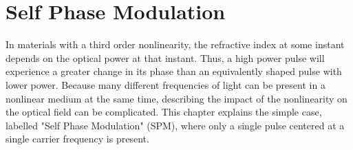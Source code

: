 \chapter{Self Phase Modulation}
\label{ch:SPM}

In materials with a third order nonlinearity, the refractive index at some instant depends on the optical power at that instant. Thus, a high power pulse will experience a greater change in its phase than an equivalently shaped pulse with lower power. Because many different frequencies of light can be present in a nonlinear medium at the same time, describing the impact of the nonlinearity on the optical field can be complicated. This chapter explains the simple case, labelled "Self Phase Modulation" (SPM), where only a single pulse centered at a single carrier frequency is present.  

